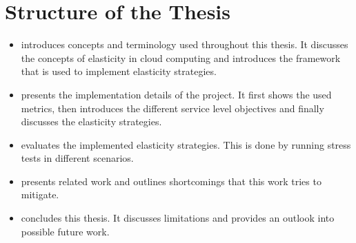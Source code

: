 \section{Structure of the Thesis}
\label{sec:structure}

\begin{itemize}
    \item {} introduces concepts and terminology used throughout this thesis. It discusses the concepts of elasticity in cloud computing and introduces the framework that is used to implement elasticity strategies.

    \item {} presents the implementation details of the project. It first shows the used metrics, then introduces the different service level objectives and finally discusses the elasticity strategies.

    \item {} evaluates the implemented elasticity strategies. This is done by running stress tests in different scenarios.

    \item {} presents related work and outlines shortcomings that this work tries to mitigate.

    \item {} concludes this thesis. It discusses limitations and provides an outlook into possible future work.
\end{itemize}
